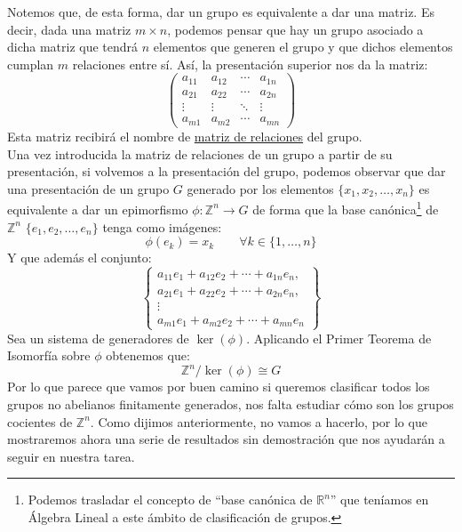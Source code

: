 Notemos que, de esta forma, dar un grupo es equivalente a dar una matriz. Es decir, dada una matriz $m\times n$, podemos pensar que hay un grupo asociado a dicha matriz que tendrá $n$ elementos que generen el grupo y que dichos elementos cumplan $m$ relaciones entre sí. Así, la presentación superior nos da la matriz:
\begin{equation*}
    \left(\begin{array}{cccc}
        a_{11} & a_{12} & \cdots & a_{1n} \\
        a_{21} & a_{22} & \cdots & a_{2n} \\
        \vdots & \vdots & \ddots & \vdots \\
        a_{m1} & a_{m2} & \cdots & a_{mn} 
    \end{array}\right)
\end{equation*}
Esta matriz recibirá el nombre de \underline{matriz de relaciones} del grupo.\\

\noindent
Una vez introducida la matriz de relaciones de un grupo a partir de su presentación, si volvemos a la presentación del grupo, podemos observar que dar una presentación de un grupo $G$ generado por los elementos $\{x_1,x_2,\ldots,x_n\}$ es equivalente a dar un epimorfismo $\phi: \mathbb{Z}^n \to G$ de forma que la base canónica\footnote{Podemos trasladar el concepto de ``base canónica de $\mathbb{R}^n$'' que teníamos en Álgebra Lineal a este ámbito de clasificación de grupos.} de $\mathbb{Z}^n$ $\{e_1,e_2,\ldots, e_n\}$ tenga como imágenes:
\begin{equation*}
    \phi(e_k) = x_k \qquad \forall k\in \{1,\ldots,n\}
\end{equation*}
Y que además el conjunto:
\begin{equation*}
    \left\{\begin{array}{c}
        a_{11}e_1+a_{12}e_2 + \cdots + a_{1n}e_n,\\
        a_{21}e_1 + a_{22}e_2+\cdots+a_{2n}e_n, \\ 
        \vdots\\
        a_{m1}e_1+a_{m2}e_2 + \cdots + a_{mn}e_n
    \end{array}\right\}
\end{equation*}
Sea un sistema de generadores de $\ker(\phi)$. Aplicando el Primer Teorema de Isomorfía sobre $\phi$ obtenemos que:
\begin{equation*}
    \mathbb{Z}^n/\ker(\phi) \cong G
\end{equation*}
Por lo que parece que vamos por buen camino si queremos clasificar todos los grupos no abelianos finitamente generados, nos falta estudiar cómo son los grupos cocientes de $\mathbb{Z}^n$. Como dijimos anteriormente, no vamos a hacerlo, por lo que mostraremos ahora una serie de resultados sin demostración que nos ayudarán a seguir en nuestra tarea.\\

